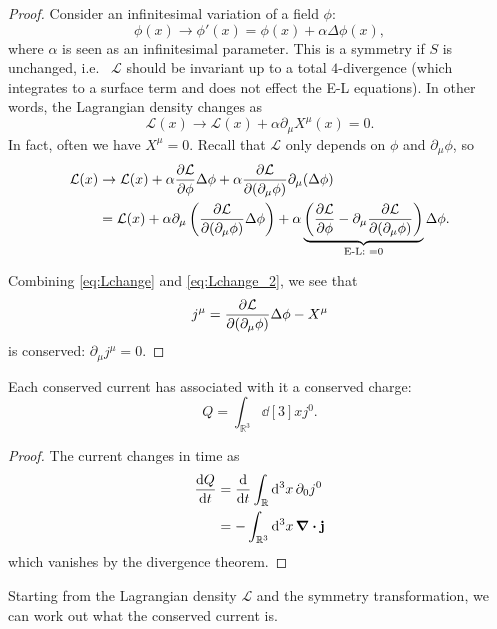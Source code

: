 \begin{proof}

  Consider an infinitesimal variation of a field $\phi$:
  \begin{equation}
    \phi(x) \to \phi'(x) = \phi(x) + \alpha \Delta \phi(x),
  \end{equation} 
  where $\alpha$ is seen as an infinitesimal parameter.
  This is a symmetry if $S$ is unchanged, i.e.~ $\mathcal{L}$ should be invariant up to a total $4$-divergence (which integrates to a surface term and does not effect the E-L equations).
  In other words, the Lagrangian density changes as
  \begin{equation}
    \label{eq:Lchange}
    \mathcal{L}(x) \to \mathcal{L}(x) + \alpha \partial_\mu X^\mu(x) = 0.
  \end{equation}
  In fact, often we have $X^\mu = 0$.
  Recall that $\mathcal{L}$ only depends on $\phi$ and $\partial_\mu \phi$, so
  \begin{align}
    \mathcal{L}(x) &\to \mathcal{L}(x) + \alpha \pdv{\mathcal{L}}{\phi} \Delta \phi + \alpha \pdv{\mathcal{L}}{(\partial_\mu \phi)} \partial_\mu(\Delta \phi) \\
    \label{eq:Lchange_2}
    &= \mathcal{L}(x) + \alpha \partial_\mu \left( \pdv{\mathcal{L}}{(\partial_\mu \phi)} \Delta \phi \right) + \alpha \underbrace{\left( \pdv{\mathcal{L}}{\phi} - \partial_\mu \pdv{\mathcal{L}}{(\partial_\mu \phi)} \right)}_{\text{E-L: } = 0} \Delta \phi.
  \end{align}

  Combining \eqref{eq:Lchange} and \eqref{eq:Lchange_2}, we see that
  \begin{equation}
    j^\mu = \pdv{\mathcal{L}}{(\partial_\mu \phi)} \Delta \phi - X^\mu
  \end{equation}
  is conserved: $\partial_\mu j^\mu = 0$.
\end{proof}
\begin{leftbar}
  \begin{remark}
    Each conserved current has associated with it a conserved charge:
    \begin{equation}
      Q = \int_{\mathbb{R}^3}^{} \dd[3]{x} j^0.
    \end{equation}
    \begin{proof}
      The current changes in time as
      \begin{align}
	\dv{Q}{t} &= \dv{}{t} \int_{\mathbb{R}}^{} \dd[3]{x} \partial_0 j^0 \\
	&= - \int_{\mathbb{R}^3}^{} \dd[3]{x} \div \vb{j}
      \end{align}
      which vanishes by the divergence theorem.
    \end{proof}
    Starting from the Lagrangian density $\mathcal{L}$ and the symmetry transformation, we can work out what the conserved current is.
  \end{remark}
\end{leftbar}

